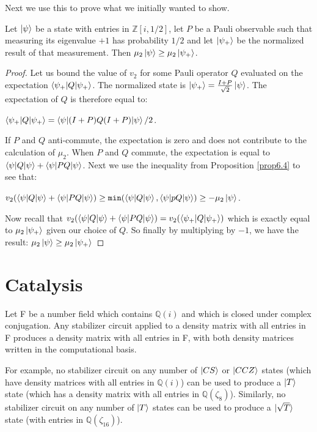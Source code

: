 \documentclass[12pt]{dalthesis}
\begin{document}
Next we use this to prove what we initially wanted to show.
\begin{proposition}
\label{dyadic is monotone}
Let $\ket{\psi}$ be a state with entries in $\mathbb{Z}[i, 1/2]$, let $P$ be a Pauli observable such that measuring its eigenvalue $+1$ has probability $1/2$ and let $\ket{\psi_+}$ be the normalized result of that measurement. Then $\mu_2\ket{\psi} \geq \mu_2\ket{\psi_+}$. 
\end{proposition}
\begin{proof}
Let us bound the value of $v_2$ for some Pauli operator $Q$ evaluated on the expectation $\braket{\psi_+ | Q |\psi_+}$. The normalized state is $\ket{\psi_+} = \frac{I + P}{\sqrt{2}}\ket{\psi}$. The expectation of $Q$ is therefore equal to:
\begin{center}
$\braket{\psi_+ | Q |\psi_+} = \braket{\psi | (I + P)Q(I + P) | \psi}/2$.
\end{center}
If $P$ and $Q$ anti-commute, the expectation is zero and does not contribute to the calculation of $\mu_2$. When $P$ and $Q$ commute, the expectation is equal to $\braket{\psi | Q | \psi} + \braket{\psi |PQ |\psi}$. Next we use the inequality from Proposition \ref{prop6.4} to see that:
\begin{center}
$v_2(\braket{\psi |Q| \psi} + \braket{\psi |PQ| \psi}) \geq \texttt{min}(\braket{\psi |Q|\psi}, \braket{\psi |pQ|\psi}) \geq -\mu_2\ket{\psi}$.
\end{center}
Now recall that $v_2(\braket{\psi |Q| \psi} + \braket{\psi |PQ| \psi}) = v_2(\braket{\psi_+ |Q| \psi_+})$ which is exactly equal to $\mu_2\ket{\psi_+}$ given our choice of $Q$. So finally by multiplying by $-1$, we have the result: $\mu_2\ket{\psi} \geq \mu_2\ket{\psi_+}$
\end{proof}


\section{Catalysis}

\begin{theorem}
Let F be a number field which contains $\mathbb{Q}(i)$ and which is closed under complex conjugation. Any stabilizer circuit applied to a density matrix with all entries in F produces a density matrix with all entries in F, with both density matrices written in the computational basis.
\end{theorem}

For example, no stabilizer circuit on any number of $\ket{CS}$ or $\ket{CCZ}$ states (which have density matrices with all entries in $\mathbb{Q}(i)$) can be used to produce a $\ket{T}$ state (which has a density matrix with all entries in $\mathbb{Q}(\zeta_8)$). Similarly, no stabilizer circuit on any number of $\ket{T}$ states can be used to produce a $\ket{\sqrt{T}}$ state (with entries in $\mathbb{Q}(\zeta_{16})$).
 
\end{document}
